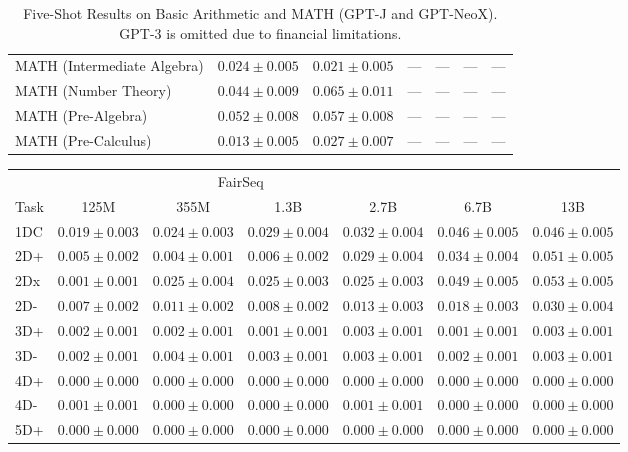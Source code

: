 \documentclass[11pt]{article}
\begin{document}
{\begin{landscape}
\begin{table}
\begin{tabular}{l c c c c c c }
MATH (Intermediate Algebra) & $0.024 \pm 0.005$ & $0.021 \pm 0.005$ & --- & --- & --- & --- \\ 
MATH (Number Theory) & $0.044 \pm 0.009$ & $0.065 \pm 0.011$ & --- & --- & --- & --- \\ 
MATH (Pre-Algebra) & $0.052 \pm 0.008$ & $0.057 \pm 0.008$ & --- & --- & --- & --- \\ 
MATH (Pre-Calculus) & $0.013 \pm 0.005$ & $0.027 \pm 0.007$ & --- & --- & --- & --- \\ 
\bottomrule 
\end{tabular}
\caption{Five-Shot Results on Basic Arithmetic and MATH (GPT-J and GPT-NeoX). GPT-3 is omitted due to financial limitations.}
\label{tab:math_gpt_5}
\end{table}

\begin{table}
\centering 
\begin{tabular}{l c c c c c c } \\ 
& \multicolumn{4}{c}{FairSeq} \\ 
Task & 125M & 355M & 1.3B & 2.7B & 6.7B & 13B \\ \toprule
1DC & $0.019 \pm 0.003$ & $0.024 \pm 0.003$ & $0.029 \pm 0.004$ & $0.032 \pm 0.004$ & $0.046 \pm 0.005$ & $0.046 \pm 0.005$ \\ 
2D+ & $0.005 \pm 0.002$ & $0.004 \pm 0.001$ & $0.006 \pm 0.002$ & $0.029 \pm 0.004$ & $0.034 \pm 0.004$ & $0.051 \pm 0.005$ \\ 
2Dx & $0.001 \pm 0.001$ & $0.025 \pm 0.004$ & $0.025 \pm 0.003$ & $0.025 \pm 0.003$ & $0.049 \pm 0.005$ & $0.053 \pm 0.005$ \\ 
2D- & $0.007 \pm 0.002$ & $0.011 \pm 0.002$ & $0.008 \pm 0.002$ & $0.013 \pm 0.003$ & $0.018 \pm 0.003$ & $0.030 \pm 0.004$ \\ 
3D+ & $0.002 \pm 0.001$ & $0.002 \pm 0.001$ & $0.001 \pm 0.001$ & $0.003 \pm 0.001$ & $0.001 \pm 0.001$ & $0.003 \pm 0.001$ \\ 
3D- & $0.002 \pm 0.001$ & $0.004 \pm 0.001$ & $0.003 \pm 0.001$ & $0.003 \pm 0.001$ & $0.002 \pm 0.001$ & $0.003 \pm 0.001$ \\ 
4D+ & $0.000 \pm 0.000$ & $0.000 \pm 0.000$ & $0.000 \pm 0.000$ & $0.000 \pm 0.000$ & $0.000 \pm 0.000$ & $0.000 \pm 0.000$ \\ 
4D- & $0.001 \pm 0.001$ & $0.000 \pm 0.000$ & $0.000 \pm 0.000$ & $0.001 \pm 0.001$ & $0.000 \pm 0.000$ & $0.000 \pm 0.000$ \\ 
5D+ & $0.000 \pm 0.000$ & $0.000 \pm 0.000$ & $0.000 \pm 0.000$ & $0.000 \pm 0.000$ & $0.000 \pm 0.000$ & $0.000 \pm 0.000$ \\ 

\end{tabular}
\end{table}
\end{landscape}}
\end{document}
